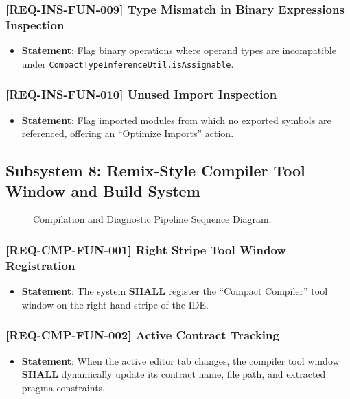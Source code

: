 \subsubsection{[REQ-INS-FUN-009] Type Mismatch in Binary Expressions Inspection}
\begin{itemize}
    \item \textbf{Statement}: Flag binary operations where operand types are incompatible under \texttt{CompactTypeInferenceUtil.isAssignable}.
\end{itemize}

\subsubsection{[REQ-INS-FUN-010] Unused Import Inspection}
\begin{itemize}
    \item \textbf{Statement}: Flag imported modules from which no exported symbols are referenced, offering an ``Optimize Imports'' action.
\end{itemize}

\subsection{Subsystem 8: Remix-Style Compiler Tool Window and Build System}
\label{sec:subsystem_compiler_window}

\begin{figure}[htbp]
    \centering
    
    \caption{Compilation and Diagnostic Pipeline Sequence Diagram.}
    \label{fig:sequence_compile}
\end{figure}

\subsubsection{[REQ-CMP-FUN-001] Right Stripe Tool Window Registration}
\begin{itemize}
    \item \textbf{Statement}: The system \textbf{SHALL} register the ``Compact Compiler'' tool window on the right-hand stripe of the IDE.
\end{itemize}

\subsubsection{[REQ-CMP-FUN-002] Active Contract Tracking}
\begin{itemize}
    \item \textbf{Statement}: When the active editor tab changes, the compiler tool window \textbf{SHALL} dynamically update its contract name, file path, and extracted pragma constraints.
\end{itemize}

